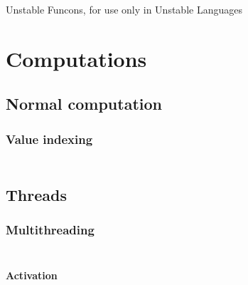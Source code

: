 Unstable Funcons, for use only in Unstable Languages

\section*{Computations}\hypertarget{computations}{}\label{computations}

\subsection*{Normal computation}\hypertarget{normal-computation}{}\label{normal-computation}

\subsubsection*{Value indexing}\hypertarget{value-indexing}{}\label{value-indexing}

\begin{align*}
  [ ~ 
  \KEY{Funcon} ~ & \NAMEHYPER{../../../../../Unstable-Funcons-beta/Computations/Normal}{Indexing}{initialise-index} \\
  \KEY{Funcon} ~ & \NAMEHYPER{../../../../../Unstable-Funcons-beta/Computations/Normal}{Indexing}{allocate-index} \\
  \KEY{Funcon} ~ & \NAMEHYPER{../../../../../Unstable-Funcons-beta/Computations/Normal}{Indexing}{lookup-index}
  ~ ]
\end{align*}
\subsection*{Threads}\hypertarget{threads}{}\label{threads}

\subsubsection*{Multithreading}\hypertarget{multithreading}{}\label{multithreading}

\begin{align*}
  [ ~ 
  \KEY{Funcon} ~ & \NAMEHYPER{../../../../../Unstable-Funcons-beta/Computations/Threads}{Multithreading}{thread-joinable}
  ~ ]
\end{align*}
\paragraph*{Activation}\hypertarget{activation}{}\label{activation}

\begin{align*}
  [ ~ 
  \KEY{Funcon} ~ & \NAMEHYPER{../../../../../Unstable-Funcons-beta/Computations/Threads}{Multithreading}{multithread} \\
  \KEY{Funcon} ~ & \NAMEHYPER{../../../../../Unstable-Funcons-beta/Computations/Threads}{Multithreading}{thread-activate}
  ~ ]
\end{align*}
